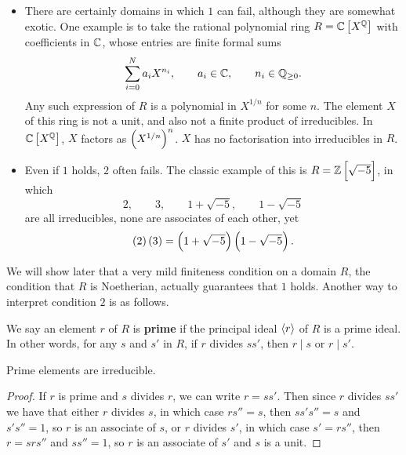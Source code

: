 \begin{example*}
\hfill
\begin{itemize}
\item There are certainly domains in which $ 1 $ can fail, although they are somewhat exotic. One example is to take the rational polynomial ring $ R = \C\sbr{X^\Q} $ with coefficients in $ \mathbb{C} $, whose entries are finite formal sums
$$ \sum_{i = 0}^N a_iX^{n_i}, \qquad a_i \in \mathbb{C}, \qquad n_i \in \mathbb{Q}_{\ge 0}. $$
Any such expression of $ R $ is a polynomial in $ X^{1 / n} $ for some $ n $. The element $ X $ of this ring is not a unit, and also not a finite product of irreducibles. In $ \C\sbr{X^\Q} $, $ X $ factors as $ \br{X^{1 / n}}^n $. $ X $ has no factorisation into irreducibles in $ R $.
\item Even if $ 1 $ holds, $ 2 $ often fails. The classic example of this is $ R = \Z\sbr{\sqrt{-5}} $, in which
$$ 2, \qquad 3, \qquad 1 + \sqrt{-5}, \qquad 1 - \sqrt{-5} $$
are all irreducibles, none are associates of each other, yet
$$ \br{2}\br{3} = \br{1 + \sqrt{-5}}\br{1 - \sqrt{-5}}. $$
\end{itemize}
\end{example*}

\pagebreak

We will show later that a very mild finiteness condition on a domain $ R $, the condition that $ R $ is Noetherian, actually guarantees that $ 1 $ holds. Another way to interpret condition $ 2 $ is as follows.

\begin{definition}
We say an element $ r $ of $ R $ is \textbf{prime} if the principal ideal $ \left\langle r \right\rangle $ of $ R $ is a prime ideal. In other words, for any $ s $ and $ s' $ in $ R $, if $ r $ divides $ ss' $, then $ r \mid s $ or $ r \mid s' $.
\end{definition}

\begin{lemma}
Prime elements are irreducible.
\end{lemma}

\begin{proof}
If $ r $ is prime and $ s $ divides $ r $, we can write $ r = ss' $. Then since $ r $ divides $ ss' $ we have that either $ r $ divides $ s $, in which case $ rs'' = s $, then $ ss's'' = s $ and $ s's'' = 1 $, so $ r $ is an associate of $ s $, or $ r $ divides $ s' $, in which case $ s' = rs'' $, then $ r = srs'' $ and $ ss'' = 1 $, so $ r $ is an associate of $ s' $ and $ s $ is a unit.
\end{proof}

